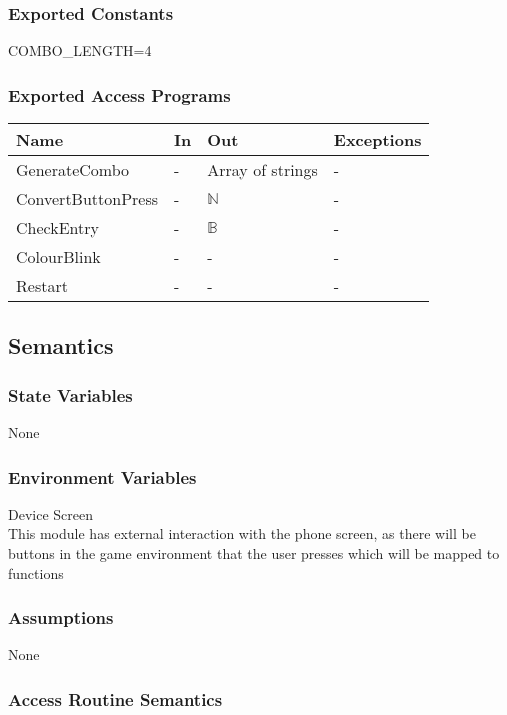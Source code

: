 \documentclass[12pt, titlepage]{article}
\begin{document}
\subsubsection{Exported Constants}
COMBO\_LENGTH=4

\subsubsection{Exported Access Programs}

\begin{center}
\begin{tabular}{p{5cm} p{4cm} p{4cm} p{2cm}}
\hline
\textbf{Name} & \textbf{In} & \textbf{Out} & \textbf{Exceptions} \\
\hline
GenerateCombo & - & Array of strings & - \\
ConvertButtonPress & - & $\mathds{N}$ & - \\
CheckEntry & - & $\mathds{B}$ & - \\
ColourBlink & - & - & - \\
Restart & - & - & - \\
\hline
\end{tabular}
\end{center}

\subsection{Semantics}

\subsubsection{State Variables}

None

\subsubsection{Environment Variables}

Device Screen\\
This module has external interaction with the phone screen, as there will be buttons in the game environment that the user presses which will be mapped to functions


\subsubsection{Assumptions}

None

\subsubsection{Access Routine Semantics}
\end{document}
